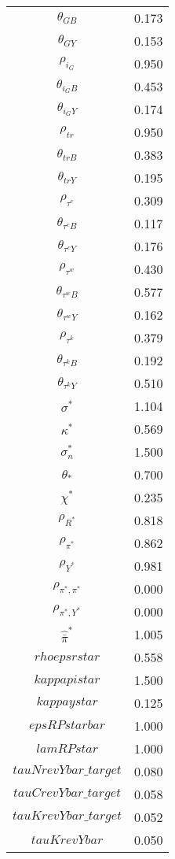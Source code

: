 \begin{center}
\begin{longtable}{cc}
$\theta_{GB}$ 	 & 	 0.173 \\
$\theta_{GY}$ 	 & 	 0.153 \\
$\rho_{i_G}$ 	 & 	 0.950 \\
$\theta_{i_GB}$ 	 & 	 0.453 \\
$\theta_{i_GY}$ 	 & 	 0.174 \\
$\rho_{tr}$ 	 & 	 0.950 \\
$\theta_{trB}$ 	 & 	 0.383 \\
$\theta_{trY}$ 	 & 	 0.195 \\
$\rho_{\tau^c}$ 	 & 	 0.309 \\
$\theta_{\tau^cB}$ 	 & 	 0.117 \\
$\theta_{\tau^cY}$ 	 & 	 0.176 \\
$\rho_{\tau^w}$ 	 & 	 0.430 \\
$\theta_{\tau^wB}$ 	 & 	 0.577 \\
$\theta_{\tau^wY}$ 	 & 	 0.162 \\
$\rho_{\tau^k}$ 	 & 	 0.379 \\
$\theta_{\tau^kB}$ 	 & 	 0.192 \\
$\theta_{\tau^kY}$ 	 & 	 0.510 \\
$\sigma^*$ 	 & 	 1.104 \\
$\kappa^*$ 	 & 	 0.569 \\
$\sigma^*_n$ 	 & 	 1.500 \\
$\theta_*$ 	 & 	 0.700 \\
$\chi^*$ 	 & 	 0.235 \\
${\rho_{R^*}}$ 	 & 	 0.818 \\
${\rho_{\pi^*}}$ 	 & 	 0.862 \\
${\rho_{Y^*}}$ 	 & 	 0.981 \\
${\rho_{\pi^*,\pi^*}}$ 	 & 	 0.000 \\
${\rho_{\pi^*,Y^*}}$ 	 & 	 0.000 \\
$\hat{\bar{\pi}}^*$ 	 & 	 1.005 \\
$rhoepsrstar$ 	 & 	 0.558 \\
$kappapistar$ 	 & 	 1.500 \\
$kappaystar$ 	 & 	 0.125 \\
$epsRPstarbar$ 	 & 	 1.000 \\
$lamRPstar$ 	 & 	 1.000 \\
$tauNrevYbar\_target$ 	 & 	 0.080 \\
$tauCrevYbar\_target$ 	 & 	 0.058 \\
$tauKrevYbar\_target$ 	 & 	 0.052 \\
$tauKrevYbar$ 	 & 	 0.050 \\

\end{longtable}
\end{center}
